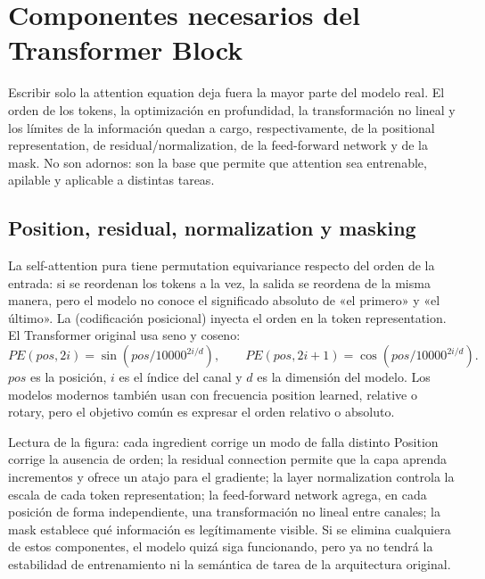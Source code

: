 \section{Componentes necesarios del Transformer Block}

Escribir solo la attention equation deja fuera la mayor parte del modelo real. El orden de los tokens, la optimización en profundidad, la transformación no lineal y los límites de la información quedan a cargo, respectivamente, de la positional representation, de residual/normalization, de la feed-forward network y de la mask. No son adornos: son la base que permite que attention sea entrenable, apilable y aplicable a distintas tareas.

\subsection{Position, residual, normalization y masking}

La self-attention pura tiene permutation equivariance respecto del orden de la entrada: si se reordenan los tokens a la vez, la salida se reordena de la misma manera, pero el modelo no conoce el significado absoluto de «el primero» y «el último». La  (codificación posicional) inyecta el orden en la token representation. El Transformer original usa seno y coseno:
\[
PE(pos,2i)=\sin\!\left(pos/10000^{2i/d}\right),\qquad
PE(pos,2i+1)=\cos\!\left(pos/10000^{2i/d}\right).
\]
$pos$ es la posición, $i$ es el índice del canal y $d$ es la dimensión del modelo. Los modelos modernos también usan con frecuencia position learned, relative o rotary, pero el objetivo común es expresar el orden relativo o absoluto.


\begin{knowledgebox}{Lectura de la figura: cada ingredient corrige un modo de falla distinto}
Position corrige la ausencia de orden; la residual connection permite que la capa aprenda incrementos y ofrece un atajo para el gradiente; la layer normalization controla la escala de cada token representation; la feed-forward network agrega, en cada posición de forma independiente, una transformación no lineal entre canales; la mask establece qué información es legítimamente visible. Si se elimina cualquiera de estos componentes, el modelo quizá siga funcionando, pero ya no tendrá la estabilidad de entrenamiento ni la semántica de tarea de la arquitectura original.
\end{knowledgebox}

